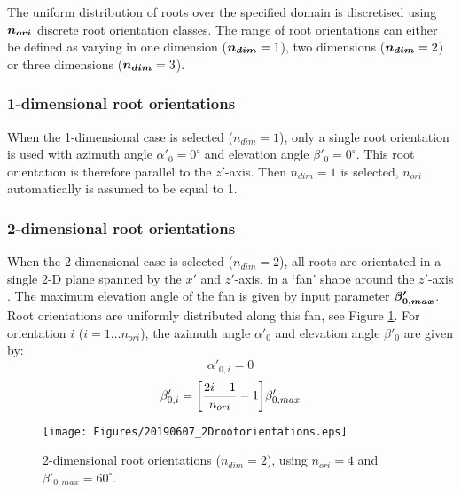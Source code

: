 \documentclass[a4 paper, 11  pt]{article}
\begin{document}
The uniform distribution of roots over the specified domain is discretised using $\vb*{n_{ori}}$ discrete root orientation classes. The range of root orientations can either be defined as varying in one dimension ($\vb*{n_{dim}}=1$), two dimensions ($\vb*{n_{dim}}=2$) or three dimensions ($\vb*{n_{dim}}=3$). 

\subsubsection{1-dimensional root orientations}
When the 1-dimensional case is selected ($n_{dim}=1$), only a single root orientation is used with azimuth angle $\alpha'_0=0^\circ$ and elevation angle $\beta'_0=0^\circ$. This root orientation is therefore parallel to the $z'$-axis. Then $n_{dim}=1$ is selected, $n_{ori}$ automatically is assumed to be equal to 1.

\subsubsection{2-dimensional root orientations}
When the 2-dimensional case is selected ($n_{dim}=2$), all roots are orientated in a single 2-D plane spanned by the $x'$ and $z'$-axis, in a `fan' shape around the $z'$-axis . The maximum elevation angle of the fan is given by input parameter $\vb*{\beta'_{0,max}}$. Root orientations are uniformly distributed along this fan, see Figure \ref{fig:2dorientations}. For orientation $i$ ($i=1...n_{ori}$), the azimuth angle $\alpha'_0$ and elevation angle $\beta'_0$ are given by:
\begin{equation}
	\alpha'_{0,i} = 0
\end{equation}
\begin{equation}
	\beta'_{0,i} = \qty[ \frac{2i-1}{n_{ori}} - 1] \beta'_{0,max}
\end{equation}
\begin{figure}
	\centering
		\texttt{[image: Figures/20190607\_2Drootorientations.eps]}
	\caption{2-dimensional root orientations ($n_{dim}=2$), using $n_{ori}=4$ and $\beta'_{0,max}=60^\circ$.}
	\label{fig:2dorientations}
\end{figure}
\end{document}
